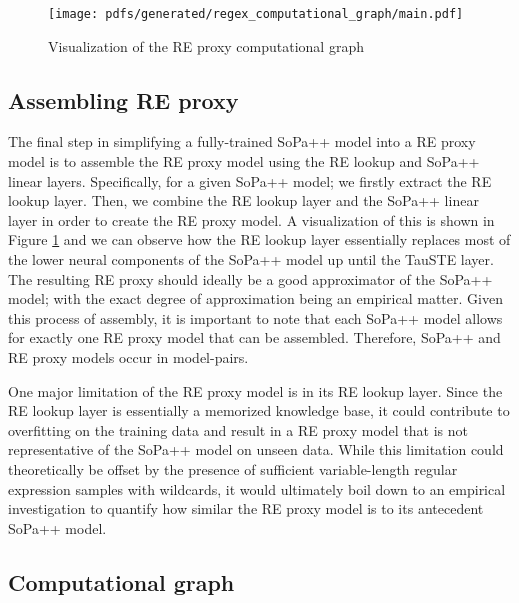 \begin{figure}[t!]
  \centering
  \texttt{[image: pdfs/generated/regex\_computational\_graph/main.pdf]}
  \caption{Visualization of the RE proxy computational graph}
  \label{fig:regex_cg}
\end{figure}

\subsection{Assembling RE proxy}

The final step in simplifying a fully-trained SoPa++ model into a RE proxy model
is to assemble the RE proxy model using the RE lookup and SoPa++ linear layers.
Specifically, for a given SoPa++ model; we firstly extract the RE lookup layer.
Then, we combine the RE lookup layer and the SoPa++ linear layer in order to
create the RE proxy model. A visualization of this is shown in Figure
\ref{fig:regex_cg} and we can observe how the RE lookup layer essentially
replaces most of the lower neural components of the SoPa++ model up until the
TauSTE layer. The resulting RE proxy should ideally be a good approximator
of the SoPa++ model; with the exact degree of approximation being an empirical
matter. Given this process of assembly, it is important to note that each SoPa++
model allows for exactly one RE proxy model that can be assembled. Therefore, SoPa++
and RE proxy models occur in model-pairs.

One major limitation of the RE proxy model is in its RE lookup layer. Since the
RE lookup layer is essentially a memorized knowledge base, it could contribute
to overfitting on the training data and result in a RE proxy model that is not
representative of the SoPa++ model on unseen data. While this limitation could
theoretically be offset by the presence of sufficient variable-length regular
expression samples with wildcards, it would ultimately boil down to an empirical
investigation to quantify how similar the RE proxy model is to its antecedent
SoPa++ model.

\subsection{Computational graph}

